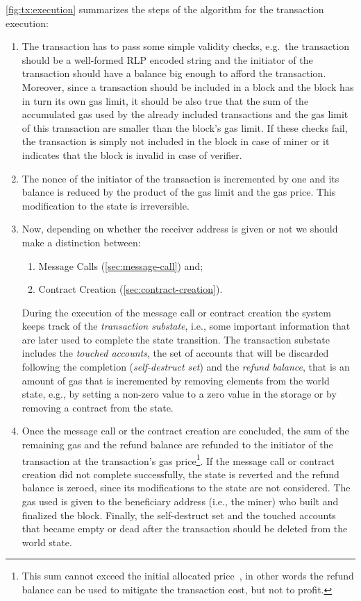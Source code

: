 \autoref{fig:tx:execution} summarizes the steps of the algorithm for the
transaction execution:
\begin{enumerate}
	\item The transaction has to pass some simple validity checks, e.g.\ the
	transaction should be a well-formed RLP encoded string and the initiator of
	the transaction should have a balance big enough to afford the transaction.
	Moreover, since a transaction should be included in a block and the block
    has in turn its own gas limit, it should be also true that the sum of the
	accumulated gas used by the already included transactions and the gas limit
    of this transaction are smaller than the block's gas limit. If these checks
    fail, the transaction is simply not included in the block in case of miner
    or it indicates that the block is invalid in case of verifier.
	\item The nonce of the initiator of the transaction is incremented by one
    and its balance is reduced by the product of the gas limit and the gas
    price. This modification to the state is irreversible.
	\item Now, depending on whether the receiver address is given or not we should
	make a distinction between:
	\begin{enumerate}[label=\alph*.]
		\item Message Calls (\autoref{sec:message-call}) and;
		\item Contract Creation (\autoref{sec:contract-creation}).
	\end{enumerate}
	During the execution of the message call or contract creation the system keeps
	track of the \emph{transaction substate}, i.e., some important information
	that are later used to complete the state transition. The transaction
    substate includes the \emph{touched accounts}, the set of accounts that
    will be discarded following the completion (\emph{self-destruct set}) and
    the \emph{refund balance}, that is an amount of gas that is incremented by
	removing elements from the world state, e.g., by setting a non-zero value
    to a zero value in the storage or by removing a contract from the state.
	\item Once the message call or the contract creation are concluded, the sum
    of the remaining gas and the refund balance are refunded to the initiator
    of the transaction at the transaction's gas price\footnote{This sum cannot
    exceed the initial allocated price~\cite{wood2018ethereum}, in other words
    the refund balance can be used to mitigate the transaction cost, but not to
    profit.}. If the message call or contract creation did not complete
    successfully, the state is reverted and the refund balance is zeroed, since
    its modifications to the state are not considered. The gas used is given to
    the beneficiary address (i.e., the miner) who built and finalized the
    block. Finally, the self-destruct set and the touched accounts that became
    empty or dead after the transaction should be deleted from the world state.
\end{enumerate}


